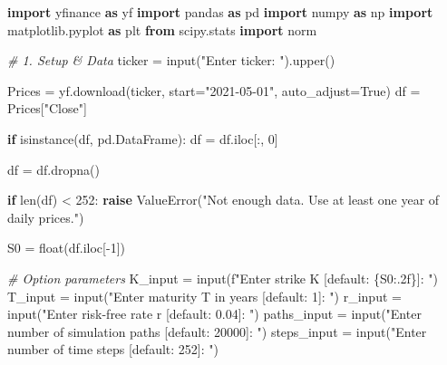 \documentclass[
  11pt,
]{article}
\newenvironment{Shaded}{}{}
\newcommand{\BuiltInTok}[1]{\textcolor[rgb]{0.00,0.50,0.00}{#1}}
\newcommand{\CommentTok}[1]{\textcolor[rgb]{0.38,0.63,0.69}{\textit{#1}}}
\newcommand{\ControlFlowTok}[1]{\textcolor[rgb]{0.00,0.44,0.13}{\textbf{#1}}}
\newcommand{\DecValTok}[1]{\textcolor[rgb]{0.25,0.63,0.44}{#1}}
\newcommand{\ImportTok}[1]{\textcolor[rgb]{0.00,0.50,0.00}{\textbf{#1}}}
\newcommand{\NormalTok}[1]{#1}
\newcommand{\OperatorTok}[1]{\textcolor[rgb]{0.40,0.40,0.40}{#1}}
\newcommand{\PreprocessorTok}[1]{\textcolor[rgb]{0.74,0.48,0.00}{#1}}
\newcommand{\SpecialCharTok}[1]{\textcolor[rgb]{0.25,0.44,0.63}{#1}}
\newcommand{\SpecialStringTok}[1]{\textcolor[rgb]{0.73,0.40,0.53}{#1}}
\newcommand{\StringTok}[1]{\textcolor[rgb]{0.25,0.44,0.63}{#1}}
\newcommand{\VariableTok}[1]{\textcolor[rgb]{0.10,0.09,0.49}{#1}}
\begin{document}
\begin{Shaded}
\begin{Highlighting}[]
\ImportTok{import}\NormalTok{ yfinance }\ImportTok{as}\NormalTok{ yf}
\ImportTok{import}\NormalTok{ pandas }\ImportTok{as}\NormalTok{ pd}
\ImportTok{import}\NormalTok{ numpy }\ImportTok{as}\NormalTok{ np}
\ImportTok{import}\NormalTok{ matplotlib.pyplot }\ImportTok{as}\NormalTok{ plt}
\ImportTok{from}\NormalTok{ scipy.stats }\ImportTok{import}\NormalTok{ norm}

\CommentTok{\# 1. Setup \& Data}
\NormalTok{ticker }\OperatorTok{=} \BuiltInTok{input}\NormalTok{(}\StringTok{"Enter ticker: "}\NormalTok{).upper()}

\NormalTok{Prices }\OperatorTok{=}\NormalTok{ yf.download(ticker, start}\OperatorTok{=}\StringTok{"2021{-}05{-}01"}\NormalTok{, auto\_adjust}\OperatorTok{=}\VariableTok{True}\NormalTok{)}
\NormalTok{df }\OperatorTok{=}\NormalTok{ Prices[}\StringTok{"Close"}\NormalTok{]}

\ControlFlowTok{if} \BuiltInTok{isinstance}\NormalTok{(df, pd.DataFrame):}
\NormalTok{    df }\OperatorTok{=}\NormalTok{ df.iloc[:, }\DecValTok{0}\NormalTok{]}

\NormalTok{df }\OperatorTok{=}\NormalTok{ df.dropna()}

\ControlFlowTok{if} \BuiltInTok{len}\NormalTok{(df) }\OperatorTok{\textless{}} \DecValTok{252}\NormalTok{:}
    \ControlFlowTok{raise} \PreprocessorTok{ValueError}\NormalTok{(}\StringTok{"Not enough data. Use at least one year of daily prices."}\NormalTok{)}

\NormalTok{S0 }\OperatorTok{=} \BuiltInTok{float}\NormalTok{(df.iloc[}\OperatorTok{{-}}\DecValTok{1}\NormalTok{])}

\CommentTok{\# Option parameters}
\NormalTok{K\_input }\OperatorTok{=} \BuiltInTok{input}\NormalTok{(}\SpecialStringTok{f"Enter strike K [default: }\SpecialCharTok{\{}\NormalTok{S0}\SpecialCharTok{:.2f\}}\SpecialStringTok{]: "}\NormalTok{)}
\NormalTok{T\_input }\OperatorTok{=} \BuiltInTok{input}\NormalTok{(}\StringTok{"Enter maturity T in years [default: 1]: "}\NormalTok{)}
\NormalTok{r\_input }\OperatorTok{=} \BuiltInTok{input}\NormalTok{(}\StringTok{"Enter risk{-}free rate r [default: 0.04]: "}\NormalTok{)}
\NormalTok{paths\_input }\OperatorTok{=} \BuiltInTok{input}\NormalTok{(}\StringTok{"Enter number of simulation paths [default: 20000]: "}\NormalTok{)}
\NormalTok{steps\_input }\OperatorTok{=} \BuiltInTok{input}\NormalTok{(}\StringTok{"Enter number of time steps [default: 252]: "}\NormalTok{)}


\end{Highlighting}
\end{Shaded}
\end{document}
